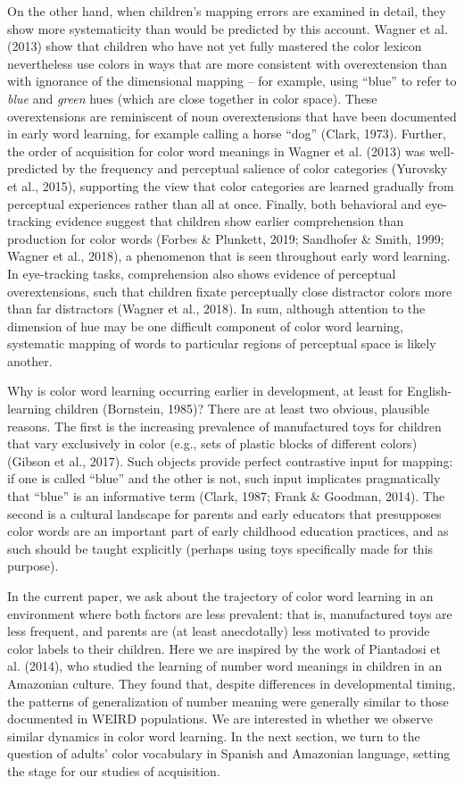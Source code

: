 \documentclass[
  english,
  ,apa7,floatsintext]{apa6}
\begin{document}
On the other hand, when children's mapping errors are examined in detail, they show more systematicity than would be predicted by this account. Wagner et al. (2013) show that children who have not yet fully mastered the color lexicon nevertheless use colors in ways that are more consistent with overextension than with ignorance of the dimensional mapping -- for example, using ``blue'' to refer to \emph{blue} and \emph{green} hues (which are close together in color space). These overextensions are reminiscent of noun overextensions that have been documented in early word learning, for example calling a horse ``dog'' (Clark, 1973). Further, the order of acquisition for color word meanings in Wagner et al. (2013) was well-predicted by the frequency and perceptual salience of color categories (Yurovsky et al., 2015), supporting the view that color categories are learned gradually from perceptual experiences rather than all at once. Finally, both behavioral and eye-tracking evidence suggest that children show earlier comprehension than production for color words (Forbes \& Plunkett, 2019; Sandhofer \& Smith, 1999; Wagner et al., 2018), a phenomenon that is seen throughout early word learning. In eye-tracking tasks, comprehension also shows evidence of perceptual overextensions, such that children fixate perceptually close distractor colors more than far distractors (Wagner et al., 2018). In sum, although attention to the dimension of hue may be one difficult component of color word learning, systematic mapping of words to particular regions of perceptual space is likely another.

Why is color word learning occurring earlier in development, at least for English-learning children (Bornstein, 1985)? There are at least two obvious, plausible reasons. The first is the increasing prevalence of manufactured toys for children that vary exclusively in color (e.g., sets of plastic blocks of different colors) (Gibson et al., 2017). Such objects provide perfect contrastive input for mapping: if one is called ``blue'' and the other is not, such input implicates pragmatically that ``blue'' is an informative term (Clark, 1987; Frank \& Goodman, 2014). The second is a cultural landscape for parents and early educators that presupposes color words are an important part of early childhood education practices, and as such should be taught explicitly (perhaps using toys specifically made for this purpose).

In the current paper, we ask about the trajectory of color word learning in an environment where both factors are less prevalent: that is, manufactured toys are less frequent, and parents are (at least anecdotally) less motivated to provide color labels to their children. Here we are inspired by the work of Piantadosi et al. (2014), who studied the learning of number word meanings in children in an Amazonian culture. They found that, despite differences in developmental timing, the patterns of generalization of number meaning were generally similar to those documented in WEIRD populations. We are interested in whether we observe similar dynamics in color word learning. In the next section, we turn to the question of adults' color vocabulary in Spanish and Amazonian language, setting the stage for our studies of acquisition.
\end{document}
